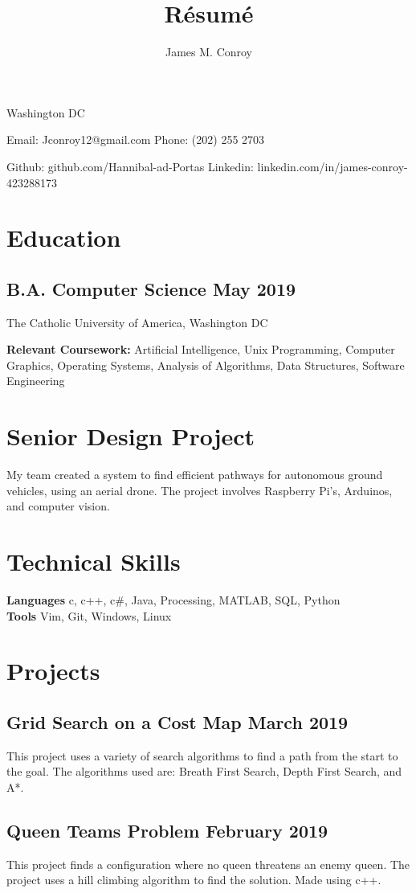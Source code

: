 \documentclass{article}
\author{James M. Conroy}
\title{R\'esum\'e}
\makeatletter
\renewcommand{\maketitle} {
	\begin{center}
	{\huge\bfseries
	\theauthor}

	Washington DC
	\end{center}


	Email: Jconroy12@gmail.com
	\hfill Phone: (202) 255 2703

	Github: github.com/Hannibal-ad-Portas
	\hfill Linkedin: linkedin.com/in/james-conroy-423288173
}
\makeatother
\begin{document}
\maketitle
\section{Education}
\subsection{B.A. Computer Science \hfill  May 2019}
The Catholic University of America, Washington DC

\textbf {Relevant Coursework:}
Artificial Intelligence,
Unix Programming,
Computer Graphics,
Operating Systems,
Analysis of Algorithms,
Data Structures,
Software Engineering
\section{Senior Design Project}
My team created a system to find efficient pathways for autonomous ground vehicles, using an aerial drone.
The project involves Raspberry Pi's, Arduinos, and computer vision.
\section{Technical Skills}

\textbf{Languages}
c,
c++,
c\#,
Java,
Processing,
MATLAB,
SQL,
Python \\
\textbf{Tools}
Vim,
Git,
Windows,
Linux

\section{Projects}

\subsection{Grid Search on a Cost Map \hfill March 2019}
This project uses a variety of search algorithms to find a path from the start to the goal.
The algorithms used are:
Breath First Search,
Depth First Search,
and
A*.
\subsection{Queen Teams Problem \hfill February 2019}
This project finds a configuration where no queen threatens an enemy queen.
The project uses a hill climbing algorithm to find the solution.
Made using c++.
\end{document}
